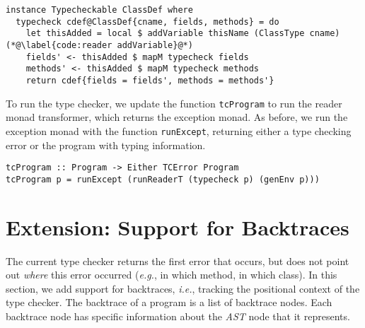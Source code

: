 \documentclass[sigplan,screen]{acmart}
\makeatletter
\newcommand{\ec}[1]{\lstinline[style=encore,breaklines=true,basicstyle=\fontsize{9}{9}\tt]@#1@}
\newcommand{\astt}[0]{\textit{AST}}
\makeatother
\begin{document}

\begin{minipage}[t]{\linewidth}
\begin{lstlisting}[style=encore]
instance Typecheckable ClassDef where
  typecheck cdef@ClassDef{cname, fields, methods} = do
    let thisAdded = local $ addVariable thisName (ClassType cname) (*@\label{code:reader addVariable}@*)
    fields' <- thisAdded $ mapM typecheck fields
    methods' <- thisAdded $ mapM typecheck methods
    return cdef{fields = fields', methods = methods'}
\end{lstlisting}
\end{minipage}

To run the type checker, we update the function \ec{tcProgram} to
run the reader monad transformer, which returns the exception monad. As before,
we run the exception monad with the function \ec{runExcept}, returning either
a type checking error or the program with typing information.

\begin{minipage}[t]{\linewidth}
\begin{lstlisting}[style=encore]
tcProgram :: Program -> Either TCError Program
tcProgram p = runExcept (runReaderT (typecheck p) (genEnv p)))
\end{lstlisting}
\end{minipage}

\section{Extension: Support for Backtraces}
\label{sec:backtrace}

The current type checker returns the first error that occurs,
but does not point out \emph{where} this error occurred
(\emph{e.g.}, in which method, in which class).
In this section, we add support for backtraces, \emph{i.e.},
tracking the positional context of the type checker.
%
The backtrace of a program is a list of backtrace nodes.
Each backtrace node has specific information about the \astt{} node that it
represents.
\end{document}
